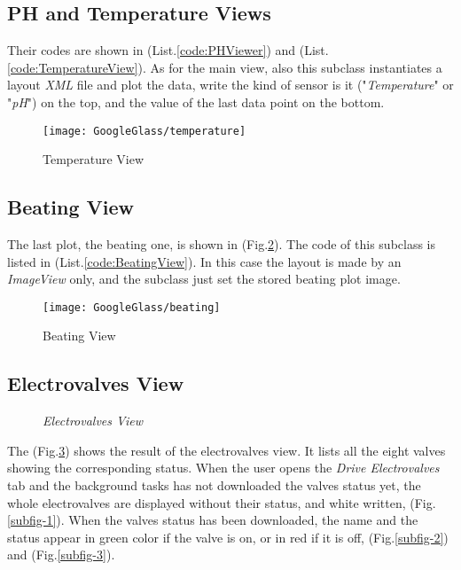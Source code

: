 \subsection{PH and Temperature Views}

Their codes are shown in (List.\ref{code:PHViewer}) and (List.\ref{code:TemperatureView}). As for the main view, also this subclass instantiates a layout \textit{XML} file and plot the data, write the kind of sensor is it ("\textit{Temperature}" or "\textit{pH}") on the top, and the value of the last data point on the bottom. 
\begin{figure}[h]
	\centering
	\texttt{[image: GoogleGlass/temperature]}
	\caption{Temperature View}
	\label{Fig:temperature}
\end{figure}

\subsection{Beating View}

The last plot, the beating one, is shown in (Fig.\ref{Fig:beating}). The code of this subclass is listed in (List.\ref{code:BeatingView}). In this case the layout is made by an \textit{ImageView} only, and the subclass just set the stored beating plot image.

\begin{figure}[h]
	\centering
	\texttt{[image: GoogleGlass/beating]}
	\caption{Beating View}
	\label{Fig:beating}
\end{figure}

\subsection{Electrovalves View}

\begin{figure}[h]
	\centering
	\hfill
	
	
	\caption{\textit{Electrovalves View}}
	\label{elele}
	
\end{figure}

The (Fig.\ref{elele}) shows the result of the electrovalves view. It lists all the eight valves showing the corresponding status. When the user opens the \textit{Drive Electrovalves} tab and the background tasks has not downloaded the valves status yet, the whole electrovalves are displayed without their status, and white written, (Fig.\ref{subfig-1}). When the valves status has been downloaded, the name and the status appear in green color if the valve is on, or in red if it is off, (Fig.\ref{subfig-2}) and (Fig.\ref{subfig-3}).

